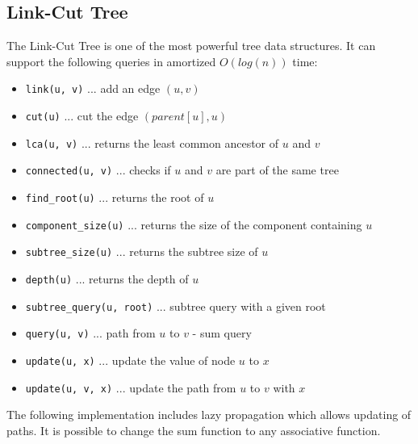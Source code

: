 \newpage

\subsection{Link-Cut Tree}

The Link-Cut Tree is one of the most powerful tree data structures.
It can support the following queries in amortized $O(log(n))$ time:

{
\begin{itemize}
  \item{\lstinline{link(u, v)} ... add an edge $(u, v)$}
  \item{\lstinline{cut(u)} ... cut the edge $(parent[u], u)$}
  \item{\lstinline{lca(u, v)} ... returns the least common ancestor of $u$ and $v$}
  \item{\lstinline{connected(u, v)} ... checks if $u$ and $v$ are part of the same tree}
  \item{\lstinline{find_root(u)} ... returns the root of $u$}
  \item{\lstinline{component_size(u)} ... returns the size of the component containing $u$}
  \item{\lstinline{subtree_size(u)} ... returns the subtree size of $u$}
  \item{\lstinline{depth(u)} ... returns the depth of $u$}
  \item{\lstinline{subtree_query(u, root)} ... subtree query with a given root}
  \item{\lstinline{query(u, v)} ... path from $u$ to $v$ - sum query}
  \item{\lstinline{update(u, x)} ... update the value of node $u$ to $x$}
  \item{\lstinline{update(u, v, x)} ... update the path from $u$ to $v$ with $x$}
\end{itemize}
}

The following implementation includes lazy propagation which allows updating of paths.
It is possible to change the sum function to any associative function.

